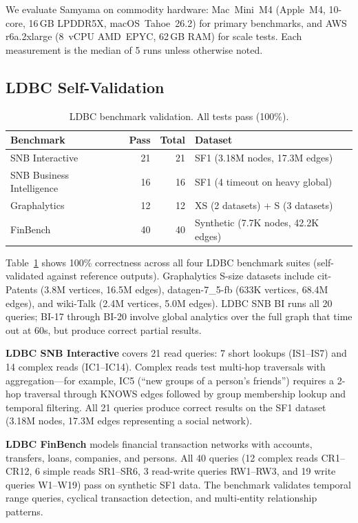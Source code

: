 \documentclass[sigconf, nonacm]{acmart}
\begin{document}
We evaluate Samyama on commodity hardware: Mac~Mini~M4 (Apple~M4, 10-core, 16\,GB LPDDR5X, macOS~Tahoe~26.2) for primary benchmarks, and AWS r6a.2xlarge (8~vCPU AMD~EPYC, 62\,GB RAM) for scale tests.
Each measurement is the median of 5 runs unless otherwise noted.

\subsection{LDBC Self-Validation}
\label{sec:ldbc}

\begin{table}[!htbp]
\caption{LDBC benchmark validation. All tests pass (100\%).}
\label{tab:ldbc}
\begin{tabular}{lrrl}
\toprule
\textbf{Benchmark} & \textbf{Pass} & \textbf{Total} & \textbf{Dataset} \\
\midrule
SNB Interactive & 21 & 21 & SF1 (3.18M nodes, 17.3M edges) \\
SNB Business Intelligence & 16 & 16 & SF1 (4 timeout on heavy global) \\
Graphalytics & 12 & 12 & XS (2 datasets) + S (3 datasets) \\
FinBench & 40 & 40 & Synthetic (7.7K nodes, 42.2K edges) \\
\bottomrule
\end{tabular}
\end{table}

Table~\ref{tab:ldbc} shows 100\% correctness across all four LDBC benchmark suites (self-validated against reference outputs).
Graphalytics S-size datasets include cit-Patents (3.8M vertices, 16.5M edges), datagen-7\_5-fb (633K vertices, 68.4M edges), and wiki-Talk (2.4M vertices, 5.0M edges).
LDBC SNB BI runs all 20 queries; BI-17 through BI-20 involve global analytics over the full graph that time out at 60s, but produce correct partial results.

\textbf{LDBC SNB Interactive} covers 21 read queries: 7 short lookups (IS1--IS7) and 14 complex reads (IC1--IC14).
Complex reads test multi-hop traversals with aggregation---for example, IC5 (``new groups of a person's friends'') requires a 2-hop traversal through KNOWS edges followed by group membership lookup and temporal filtering.
All 21 queries produce correct results on the SF1 dataset (3.18M nodes, 17.3M edges representing a social network).

\textbf{LDBC FinBench} models financial transaction networks with accounts, transfers, loans, companies, and persons.
All 40 queries (12 complex reads CR1--CR12, 6 simple reads SR1--SR6, 3 read-write queries RW1--RW3, and 19 write queries W1--W19) pass on synthetic SF1 data.
The benchmark validates temporal range queries, cyclical transaction detection, and multi-entity relationship patterns.
\end{document}
